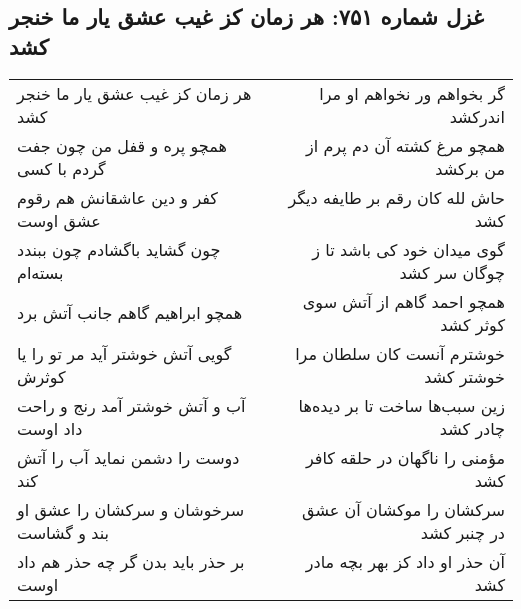\begin{center}
\section*{غزل شماره ۷۵۱: هر زمان کز غیب عشق یار ما خنجر کشد}
\label{sec:0751}
\begin{longtable}{l p{0.5cm} r}
هر زمان کز غیب عشق یار ما خنجر کشد
&&
گر بخواهم ور نخواهم او مرا اندرکشد
\\
همچو پره و قفل من چون جفت گردم با کسی
&&
همچو مرغ کشته آن دم پرم از من برکشد
\\
کفر و دین عاشقانش هم رقوم عشق اوست
&&
حاش لله کان رقم بر طایفه دیگر کشد
\\
چون گشاید باگشادم چون ببندد بسته‌ام
&&
گوی میدان خود کی باشد تا ز چوگان سر کشد
\\
همچو ابراهیم گاهم جانب آتش برد
&&
همچو احمد گاهم از آتش سوی کوثر کشد
\\
گویی آتش خوشتر آید مر تو را یا کوثرش
&&
خوشترم آنست کان سلطان مرا خوشتر کشد
\\
آب و آتش خوشتر آمد رنج و راحت داد اوست
&&
زین سبب‌ها ساخت تا بر دیده‌ها چادر کشد
\\
دوست را دشمن نماید آب را آتش کند
&&
مؤمنی را ناگهان در حلقه کافر کشد
\\
سرخوشان و سرکشان را عشق او بند و گشاست
&&
سرکشان را موکشان آن عشق در چنبر کشد
\\
بر حذر باید بدن گر چه حذر هم داد اوست
&&
آن حذر او داد کز بهر بچه مادر کشد
\\
\end{longtable}
\end{center}
